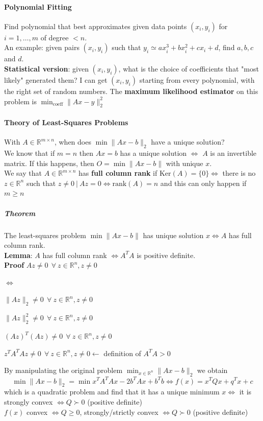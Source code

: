 \documentclass[10pt]{report}
\begin{document}
\paragraph{Polynomial Fitting} Find polynomial that best approximates given data points $(x_i,y_i)$ for $i=1,\ldots,m$ of degree $<n$.\\
An example: given pairs $(x_i, y_i)$ such that $y_i \simeq ax_i^3 + bx_i^2 + cx_i + d$, find $a,b,c$ and $d$.\\
\textbf{Statistical version}: given $(x_i, y_i)$, what is the choice of coefficients that "most likely" generated them? I can get $(x_i, y_i)$ starting from every polynomial, with the right set of random numbers. The \textbf{maximum likelihood estimator} on this problem is $\min_{\text{coeff}}\|Ax - y\|_2^2$
\paragraph{Theory of Least-Squares Problems} With $A \in \mathbb{R}^{m\times n}$, when does $\min \|Ax-b\|_2$ have a unique solution?\\
We know that if $m=n$ then $Ax = b$ has a unique solution $\Leftrightarrow$ $A$ is an invertible matrix. If this happens, then $O = \min\|Ax-b\|$ with unique $x$.\\
We say that $A\in \mathbb{R}^{m\times n}$ has \textbf{full column rank} if $\text{Ker}(A) = \{0\} \Leftrightarrow$ there is no $z\in \mathbb{R}^n$ such that $z\neq 0\:|\:Az=0\Leftrightarrow \text{rank}(A) = n$ and this can only happen if $m\geq n$
\subparagraph{Theorem} The least-squares problem $\min \|Ax-b\|$ has unique solution $x\Leftrightarrow A$ has full column rank.\\
\textbf{Lemma}: $A$ has full column rank $\Leftrightarrow A^TA$ is positive definite.\\
\textbf{Proof} $Az \neq 0\:\:\forall\:z\in \mathbb{R}^n, z\neq 0$
\begin{list}{$\Leftrightarrow$}{}
	\item $\|Az\|_2 \neq 0\:\:\forall\:z\in \mathbb{R}^n, z\neq 0$
	\item $\|Az\|_2^2 \neq 0\:\:\forall\:z\in \mathbb{R}^n, z\neq 0$
	\item $(Az)^T(Az)\neq 0\:\:\forall\:z\in \mathbb{R}^n, z\neq 0$
	\item $z^TA^TAz\neq 0\:\:\forall\:z\in \mathbb{R}^n, z\neq 0 \longleftarrow$ definition of $A^TA > 0$
\end{list}
By manipulating the original problem $\min_{x\in \mathbb{R}^n} \|Ax-b\|_2$ we obtain $$\min \|Ax-b\|_2 = \min x^TA^TAx - 2b^TAx + b^Tb \Leftrightarrow f(x) = x^TQx + q^Tx + c$$ which is a quadratic problem and find that it has a unique minimum $x \Leftrightarrow$ it is strongly convex $\Leftrightarrow Q \succ 0$ (positive definite)\\
$f(x)$ convex $\Leftrightarrow Q \geq 0$, strongly/strictly convex $\Leftrightarrow Q \succ 0$ (positive definite)
\end{document}
